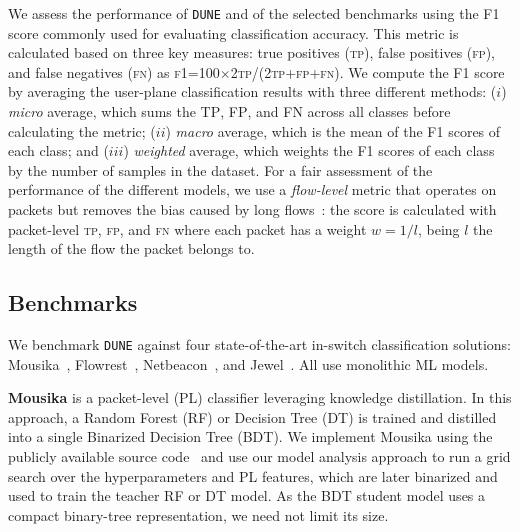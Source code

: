 \documentclass[journal]{IEEEtran}
\theoremstyle{plain} %
\newcommand{\name}{\texttt{\fontsize{9}{11}\selectfont DUNE}\xspace}
\begin{document}
We assess the performance of \name and of the selected benchmarks using the F1 score commonly used for evaluating classification accuracy. This metric is calculated based on three key measures: true positives (\textsc{tp}), false positives (\textsc{fp}), and false negatives (\textsc{fn})
as \textsc{f1}=100$\times$2\textsc{tp}/(2\textsc{tp}+\textsc{fp}+\textsc{fn}). We compute the F1 score by averaging the user-plane classification results with three different methods: ($i$) \textit{micro} average, which sums the \textsc{TP}, \textsc{FP}, and \textsc{FN} across all classes before calculating the metric; ($ii$) \textit{macro} average, which is the mean of the F1 scores of each class; and ($iii$) \textit{weighted} average, which weights the F1 scores of each class by the number of samples in the dataset.
For a fair assessment of the performance of the different models, we use a \textit{flow-level} metric that operates on packets but removes the bias caused by long flows~\cite{flow-level-metric}: the score is calculated with packet-level \textsc{tp}, \textsc{fp}, and \textsc{fn} where each packet has a weight $w = 1/l$, being $l$ the length of the flow the packet belongs to.

\subsection{Benchmarks}
\label{sub:benchmarks}
We benchmark \name against four state-of-the-art in-switch classification solutions: Mousika~\cite{mousika-journal-ton23}, Flowrest~\cite{flowrest}, Netbeacon~\cite{netbeacon}, and Jewel~\cite{jewel-infocom24}. All use monolithic ML models.

\textbf{Mousika} is a packet-level (PL) classifier leveraging knowledge distillation.
In this approach, a Random Forest (RF) or Decision Tree (DT) is trained and distilled into a single Binarized Decision Tree (BDT).
We implement Mousika using the publicly available source code~\cite{code-mousika} and
use our model analysis approach to run a grid search over the hyperparameters and PL features, which are later binarized and used to train the teacher RF or DT model.
As the BDT student model uses a compact binary-tree representation, we need not limit its size.
\end{document}
